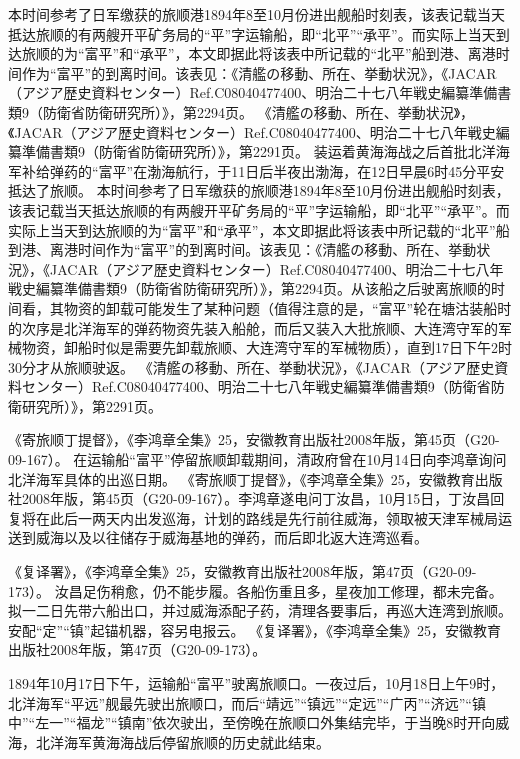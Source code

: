 \documentclass[12pt,UTF8]{ctexbook}
\begin{document}
本时间参考了日军缴获的旅顺港1894年8至10月份进出舰船时刻表，该表记载当天抵达旅顺的有两艘开平矿务局的“平”字运输船，即“北平”“承平”。而实际上当天到达旅顺的为“富平”和“承平”，本文即据此将该表中所记载的“北平”船到港、离港时间作为“富平”的到离时间。该表见：《清艦の移動、所在、挙動状況》，《JACAR（アジア歴史資料センター）Ref.C08040477400、明治二十七八年戦史編纂準備書類9（防衛省防衛研究所）》，第2294页。
《清艦の移動、所在、挙動状況》，《JACAR（アジア歴史資料センター）Ref.C08040477400、明治二十七八年戦史編纂準備書類9（防衛省防衛研究所）》，第2291页。
装运着黄海海战之后首批北洋海军补给弹药的“富平”在渤海航行，于11日后半夜出渤海，在12日早晨6时45分平安抵达了旅顺。 本时间参考了日军缴获的旅顺港1894年8至10月份进出舰船时刻表，该表记载当天抵达旅顺的有两艘开平矿务局的“平”字运输船，即“北平”“承平”。而实际上当天到达旅顺的为“富平”和“承平”，本文即据此将该表中所记载的“北平”船到港、离港时间作为“富平”的到离时间。该表见：《清艦の移動、所在、挙動状況》，《JACAR（アジア歴史資料センター）Ref.C08040477400、明治二十七八年戦史編纂準備書類9（防衛省防衛研究所）》，第2294页。从该船之后驶离旅顺的时间看，其物资的卸载可能发生了某种问题（值得注意的是，“富平”轮在塘沽装船时的次序是北洋海军的弹药物资先装入船舱，而后又装入大批旅顺、大连湾守军的军械物资，卸船时似是需要先卸载旅顺、大连湾守军的军械物质），直到17日下午2时30分才从旅顺驶返。 《清艦の移動、所在、挙動状況》，《JACAR（アジア歴史資料センター）Ref.C08040477400、明治二十七八年戦史編纂準備書類9（防衛省防衛研究所）》，第2291页。

《寄旅顺丁提督》，《李鸿章全集》25，安徽教育出版社2008年版，第45页（G20-09-167）。
在运输船“富平”停留旅顺卸载期间，清政府曾在10月14日向李鸿章询问北洋海军具体的出巡日期。 《寄旅顺丁提督》，《李鸿章全集》25，安徽教育出版社2008年版，第45页（G20-09-167）。李鸿章遂电问丁汝昌，10月15日，丁汝昌回复将在此后一两天内出发巡海，计划的路线是先行前往威海，领取被天津军械局运送到威海以及以往储存于威海基地的弹药，而后即北返大连湾巡看。

《复译署》，《李鸿章全集》25，安徽教育出版社2008年版，第47页（G20-09-173）。
汝昌足伤稍愈，仍不能步履。各船伤重且多，星夜加工修理，都未完备。拟一二日先带六船出口，并过威海添配子药，清理各要事后，再巡大连湾到旅顺。安配“定”“镇”起锚机器，容另电报云。 《复译署》，《李鸿章全集》25，安徽教育出版社2008年版，第47页（G20-09-173）。

1894年10月17日下午，运输船“富平”驶离旅顺口。一夜过后，10月18日上午9时，北洋海军“平远”舰最先驶出旅顺口，而后“靖远”“镇远”“定远”“广丙”“济远”“镇中”“左一”“福龙”“镇南”依次驶出，至傍晚在旅顺口外集结完毕，于当晚8时开向威海，北洋海军黄海海战后停留旅顺的历史就此结束。
\end{document}
